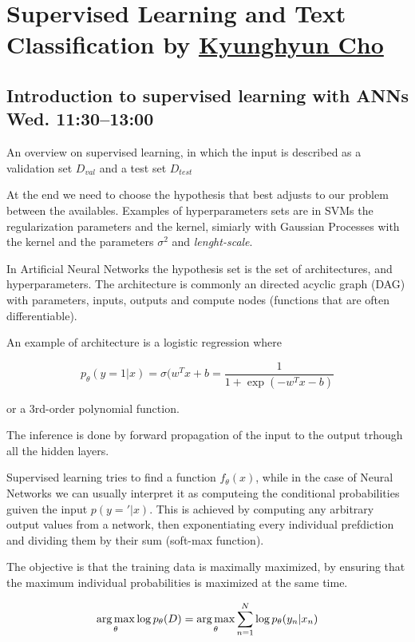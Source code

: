 \chapter{Supervised Learning and Text Classification by
\href{http://www.kyunghyuncho.me/}{Kyunghyun Cho}}

\section{Introduction to supervised learning with ANNs Wed.  11:30--13:00}

An overview on supervised learning, in which the input is described as a
validation set $D_{val}$ and a test set $D_{test}$

At the end we need to choose the hypothesis that best adjusts to our problem
between the availables. Examples of hyperparameters sets are in SVMs the
regularization parameters and the kernel, simiarly with Gaussian Processes with
the kernel and the parameters $\sigma^2$ and \emph{lenght-scale}.

In Artificial Neural Networks the hypothesis set is the set of architectures,
and hyperparameters. The architecture is commonly an directed acyclic graph
(DAG) with parameters, inputs, outputs and compute nodes (functions that are
often differentiable).

An example of architecture is a logistic regression where

\begin{equation}
  p_\theta(y=1|x) = \sigma(w^T x + b = \frac{1}{1 + \exp(-w^T x - b)}
\end{equation}

or a 3rd-order polynomial function.

The inference is done by forward propagation of the input to the output trhough
all the hidden layers.

Supervised learning tries to find a function $f_\theta(x)$, while in the case
of Neural Networks we can usually interpret it as computeing the conditional
probabilities guiven the input $p(y='|x)$. This is achieved by computing any
arbitrary output values from a network, then exponentiating every individual
prefdiction and dividing them by their sum (soft-max function).

The objective is that the training data is maximally maximized, by ensuring
that the maximum individual probabilities is maximized at the same time.

\begin{equation}
  \operatorname*{arg\,max}_\theta \log p_\theta(D) = \operatorname*{arg\,max}_\theta \sum_{n=1}^N \log
  p_\theta(y_n|x_n)
\end{equation}

